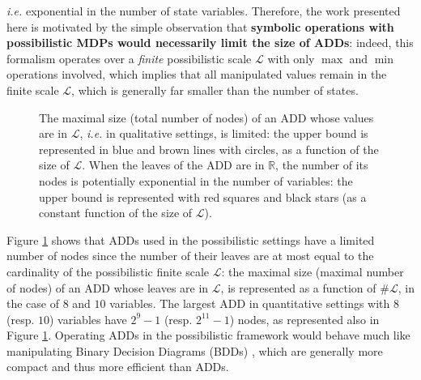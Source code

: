 \textit{i.e.} exponential in the
number of state variables.
Therefore, the work presented here is motivated by the simple observation that
\textbf{symbolic operations with possibilistic MDPs would necessarily
limit the size of ADDs}: indeed, this formalism operates over a \emph{finite}
possibilistic scale $\mathcal{L}$ with only $\max$ and $\min$ operations involved,
which implies that all manipulated values remain in the %
finite scale $\mathcal{L}$, which is generally far smaller than the number of states.
\begin{figure} \centering
{}
\caption[Limitations of the maximal size of an ADD in the possibilistic settings]{
The maximal size (total number of nodes) 
of an ADD whose values are in $\mathcal{L}$,
\textit{i.e.} in qualitative settings, is limited:
the upper bound is represented in blue and brown lines with circles,
as a function of the size of $\mathcal{L}$.
When the leaves of the ADD are in $\mathbb{R}$,
the number of its nodes is potentially exponential in the number of variables:
the upper bound is represented with red squares and black stars
(as a constant function of the size of $\mathcal{L}$).}
\label{ADDsize}
\end{figure}

Figure \ref{ADDsize} shows that 
ADDs used in the possibilistic settings 
have a limited number of nodes
since the number of their leaves 
are at most equal 
to the cardinality of the possibilistic
finite scale $\mathcal{L}$:
the maximal size (maximal number of nodes) of an ADD
whose leaves are in $\mathcal{L}$, is represented
as a function of $\# \mathcal{L}$,
in the case of $8$ and $10$ variables. 
The largest ADD in quantitative settings
with $8$ (resp. $10$) variables 
have $2^9-1$ (resp. $2^{11}-1$) nodes,
as represented also in Figure \ref{ADDsize}.
Operating ADDs in the possibilistic framework would behave much
like manipulating Binary Decision Diagrams (BDDs)
\cite{Bryant92symbolicboolean}, which are generally more compact and thus more
efficient than ADDs. 

